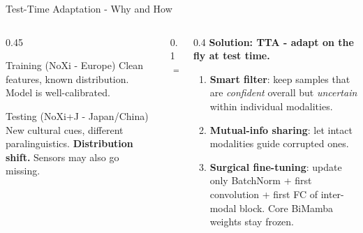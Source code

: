 \documentclass[aspectratio=169]{beamer}
\newcommand{\hl}[1]{\textcolor{coolpurple}{\textbf{#1}}}
\begin{document}
	\begin{frame}{Test-Time Adaptation - Why and How}
		\begin{columns}
			\begin{column}{0.45\textwidth}
				\begin{block}{Training (NoXi - Europe)}
					Clean features, known distribution. Model is well-calibrated.
				\end{block}
				\vspace{0.3em}
				\begin{block}{Testing (NoXi+J - Japan/China)}
					New cultural cues, different paralinguistics. \hl{Distribution shift.} Sensors may also go missing.
				\end{block}
			\end{column}
			\begin{column}{0.1\textwidth}
				\centering \Large $\Rightarrow$
			\end{column}
			\begin{column}{0.4\textwidth}
				\textbf{Solution: TTA - adapt on the fly at test time.}
				\vspace{0.5em}
				\begin{enumerate}
					\item \textbf{Smart filter}: keep samples that are \textit{confident} overall but \textit{uncertain} within individual modalities.
					\item \textbf{Mutual-info sharing}: let intact modalities guide corrupted ones.
					\item \textbf{Surgical fine-tuning}: update only BatchNorm + first convolution + first FC of inter-modal block. Core BiMamba weights stay frozen.
				\end{enumerate}
			\end{column}
		\end{columns}
	\end{frame}
	
\end{document}
